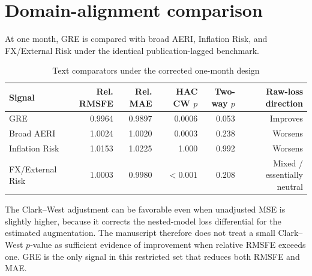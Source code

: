 \documentclass[12pt]{article}
\begin{document}
\section{Domain-alignment comparison}
At one month, GRE is compared with broad AERI, Inflation Risk, and FX/External Risk under the identical publication-lagged benchmark.
\begin{table}[htbp]
\centering\scriptsize
\caption{Text comparators under the corrected one-month design}
\begin{tabular}{lrrrrr}
\toprule
Signal & Rel. RMSFE & Rel. MAE & HAC CW $p$ & Two-way $p$ & Raw-loss direction\\
\midrule
GRE & 0.9964 & 0.9897 & 0.0006 & 0.053 & Improves\\
Broad AERI & 1.0024 & 1.0020 & 0.0003 & 0.238 & Worsens\\
Inflation Risk & 1.0153 & 1.0225 & 1.000 & 0.992 & Worsens\\
FX/External Risk & 1.0003 & 0.9980 & $<0.001$ & 0.208 & Mixed / essentially neutral\\
\bottomrule
\end{tabular}
\end{table}

The Clark--West adjustment can be favorable even when unadjusted MSE is slightly higher, because it corrects the nested-model loss differential for the estimated augmentation. The manuscript therefore does not treat a small Clark--West $p$-value as sufficient evidence of improvement when relative RMSFE exceeds one. GRE is the only signal in this restricted set that reduces both RMSFE and MAE.
\end{document}
